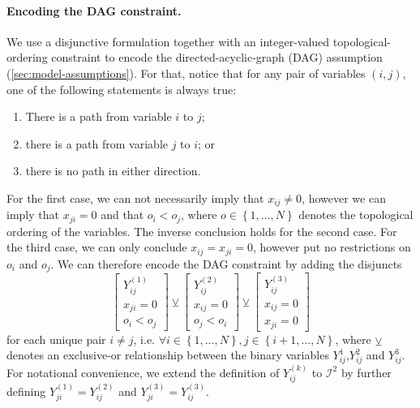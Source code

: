 \documentclass[11pt]{article}
\begin{document}
\paragraph{Encoding the DAG constraint.  \label{sec:encoding-dag-constraint}}
\label{sec:org598a473}
We use a disjunctive formulation together with an integer-valued topological-ordering constraint to encode the directed-acyclic-graph (DAG) assumption (\cref{sec:model-assumptions}).
For that, notice that for any pair of variables \((i, j)\), one of the following statements is always true:
\begin{enumerate}
\item There is a path from variable \(i\) to \(j\);
\item there is a path from variable \(j\) to \(i\); or
\item there is no path in either direction.
\end{enumerate}
For the first case, we can not necessarily imply that \(x_{ij} \neq 0\), however we can imply that \(x_{ji} = 0\) and that \(o_i < o_j\), where \(o \in \left\{ 1, \dots, N \right\}\) denotes the topological ordering of the variables.
The inverse conclusion holds for the second case.
For the third case, we can only conclude \(x_{ij} = x_{ji} = 0\), however put no restrictions on \(o_i\) and \(o_j\).
We can therefore encode the DAG constraint by adding the disjuncts
\begin{equation}
\label{eq:dag-disjuncts}
\begin{bmatrix}
Y^{(1)}_{ij} \\
x_{ji} = 0 \\
o_i < o_j
\end{bmatrix} \veebar
\begin{bmatrix}
Y^{(2)}_{ij} \\
x_{ij} = 0 \\
o_j < o_i
\end{bmatrix} \veebar
\begin{bmatrix}
Y^{(3)}_{ij} \\
x_{ij} = 0 \\
x_{ji} = 0
\end{bmatrix}
\end{equation}
for each unique pair \(i \neq j\), i.e. \(\forall i \in \left\{ 1, \dots, N \right\}, j \in \left\{ i+1, \dots, N \right\}\), where \(\veebar\) denotes an exclusive-or relationship between the binary variables \(Y^1_{ij}\),\(Y^2_{ij}\) and \(Y^3_{ij}\).
For notational convenience, we extend the definition of \(Y^{(k)}_{ij}\) to \(\mathcal{I}^2\) by further defining \(Y^{(1)}_{ji} = Y^{(2)}_{ij}\) and \(Y^{(3)}_{ji} = Y^{(3)}_{ij}\).
\end{document}
